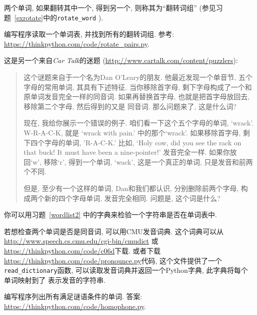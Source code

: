 \documentclass[10pt]{book}
\begin{document}
\begin{exercise}
\label{exrotatepairs}

两个单词, 如果翻转其中一个, 得到另一个, 则称其为``翻转词组''
(参见习题~\ref{exrotate}中的\verb"rotate_word" ).

编写程序读取一个单词表, 并找到所有的翻转词组. 
参考: \url{https://thinkpython.com/code/rotate_pairs.py}.

\end{exercise}


\begin{exercise}

这是另一个来自{\em Car Talk}的迷题
(\url{http://www.cartalk.com/content/puzzlers}):

\begin{quote}
这个谜题来自于一个名为Dan O'Leary的朋友. 
他最近发现一个单音节, 五个字母的常用单词, 其具有下述特征. 
当你移除首字母, 剩下字母构成了一个和原单词发音完全一样的同音词. 
如果再替换首字母, 也就是把首字母放回去, 移除第二个字母, 然后得到的又是
同音词. 那么问题来了, 这是什么词?

现在, 我给你展示一个错误的例子. 
咱们看一下这个五个字母的单词, `wrack'.  W-R-A-C-K, 就是
`wrack with pain.' 中的那个`wrack'. 
如果移除首字母, 剩下四个字母的单词, 'R-A-C-K.' 
比如, `Holy cow, did you see the rack on that buck!
It must have been a nine-pointer!' 发音完全一样. 
如果你放回`w', 移除`r', 得到一个单词, `wack', 
这是一个真正的单词, 只是发音和前两个不同. 

但是, 至少有一个这样的单词, Dan和我们都认识, 
分别删除前两个字母, 构成两个新的四个字母单词, 发音完全相同. 
问题是, 这个词是什么?
\end{quote}

你可以用习题~\ref{wordlist2} 中的字典来检验一个字符串是否在单词表中. 

若想检查两个单词是否是同音词, 可以用CMU发音词典. 
这个词典可以从\url{http://www.speech.cs.cmu.edu/cgi-bin/cmudict}
或\url{https://thinkpython.com/code/c06d}下载. 
或者下载\url{https://thinkpython.com/code/pronounce.py}代码, 
这个文件提供了一个 \verb"read_dictionary"函数, 
可以读取发音词典并返回一个Python字典, 此字典将每个单词映射到了
表示发音的字符串. 

编写程序列出所有满足谜语条件的单词. 
答案: \url{https://thinkpython.com/code/homophone.py}.

\end{exercise}
\end{document}
